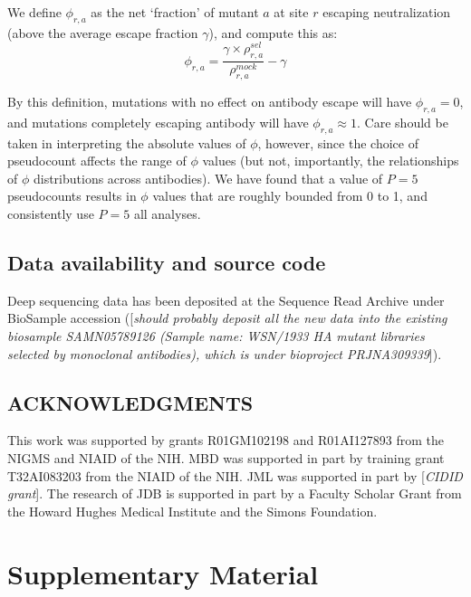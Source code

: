 \documentclass[11pt]{article}
\newcommand{\comment}[1]{{\color{red}[\textsl{#1}]}}
\begin{document}
We define $\phi_{r,a}$ as the net `fraction' of mutant $a$ at site $r$ escaping neutralization (above the average escape fraction $\gamma$), and compute this as:
$$\phi_{r,a} = \frac{\gamma \times \rho_{r,a}^{sel}}{\rho_{r,a}^{mock}} - \gamma$$

By this definition, mutations with no effect on antibody escape will have $\phi_{r,a} =0$, and mutations completely escaping antibody will have $\phi_{r,a} \approx 1$.
Care should be taken in interpreting the absolute values of $\phi$, however, since the choice of pseudocount affects the range of $\phi$ values (but not, importantly, the relationships of $\phi$ distributions across antibodies).
We have found that a value of $P=5$ pseudocounts results in $\phi$ values that are roughly bounded from 0 to 1, and consistently use $P=5$ all analyses.

\subsection*{Data availability and source code}
Deep sequencing data has been deposited at the Sequence Read Archive under BioSample accession (\comment{should probably deposit all the new data into the existing biosample SAMN05789126 (Sample name: WSN/1933 HA mutant libraries selected by monoclonal antibodies), which is under bioproject PRJNA309339}).




\clearpage

\small
\subsection*{ACKNOWLEDGMENTS}
This work was supported by grants R01GM102198 and R01AI127893 from the NIGMS and NIAID of the NIH.
MBD was supported in part by training grant T32AI083203 from the NIAID of the NIH.
JML was supported in part by \comment{CIDID grant}.
The research of JDB is supported in part by a Faculty Scholar Grant from the Howard Hughes Medical Institute and the Simons Foundation.




\clearpage
\normalsize

\section*{Supplementary Material}
\end{document}
